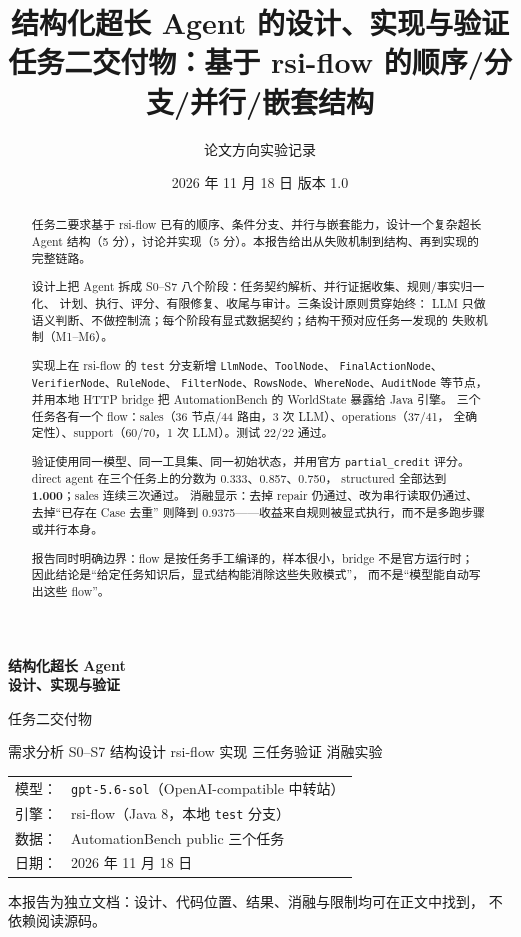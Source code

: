 \documentclass[UTF8,a4paper,11pt]{ctexart}
\title{\textbf{结构化超长 Agent 的设计、实现与验证}\\[6pt]
\large 任务二交付物：基于 rsi-flow 的顺序/分支/并行/嵌套结构}
\author{论文方向实验记录}
\date{2026 年 11 月 18 日 \quad 版本 1.0}
\begin{document}
\begin{titlepage}
\centering
\vspace*{3cm}
{\Huge\bfseries 结构化超长 Agent\\[8pt] 设计、实现与验证\par}
\vspace{0.8cm}
{\Large 任务二交付物\par}
\vspace{1.5cm}
{\large 需求分析 \quad S0--S7 结构设计 \quad rsi-flow 实现 \quad 三任务验证 \quad 消融实验\par}
\vspace{3cm}
\begin{tabular}{rl}
模型： & \texttt{gpt-5.6-sol}（OpenAI-compatible 中转站） \\
引擎： & rsi-flow（Java 8，本地 \texttt{test} 分支） \\
数据： & AutomationBench public 三个任务 \\
日期： & 2026 年 11 月 18 日 \\
\end{tabular}
\vfill
{\small 本报告为独立文档：设计、代码位置、结果、消融与限制均可在正文中找到，
不依赖阅读源码。\par}
\end{titlepage}

\begin{abstract}
任务二要求基于 rsi-flow 已有的顺序、条件分支、并行与嵌套能力，设计一个复杂超长
Agent 结构（5 分），讨论并实现（5 分）。本报告给出从失败机制到结构、再到实现的
完整链路。

设计上把 Agent 拆成 S0--S7 八个阶段：任务契约解析、并行证据收集、规则/事实归一化、
计划、执行、评分、有限修复、收尾与审计。三条设计原则贯穿始终：
LLM 只做语义判断、不做控制流；每个阶段有显式数据契约；结构干预对应任务一发现的
失败机制（M1--M6）。

实现上在 rsi-flow 的 \texttt{test} 分支新增 \texttt{LlmNode}、\texttt{ToolNode}、
\texttt{FinalActionNode}、\texttt{VerifierNode}、\texttt{RuleNode}、
\texttt{FilterNode}、\texttt{RowsNode}、\texttt{WhereNode}、\texttt{AuditNode}
等节点，并用本地 HTTP bridge 把 AutomationBench 的 WorldState 暴露给 Java 引擎。
三个任务各有一个 flow：sales（36 节点/44 路由，3 次 LLM）、operations（37/41，
全确定性）、support（60/70，1 次 LLM）。测试 22/22 通过。

验证使用同一模型、同一工具集、同一初始状态，并用官方 \texttt{partial\_credit}
评分。direct agent 在三个任务上的分数为 0.333、0.857、0.750，
structured 全部达到 \textbf{1.000}；sales 连续三次通过。
消融显示：去掉 repair 仍通过、改为串行读取仍通过、去掉“已存在 Case 去重”
则降到 0.9375——收益来自规则被显式执行，而不是多跑步骤或并行本身。

报告同时明确边界：flow 是按任务手工编译的，样本很小，bridge 不是官方运行时；
因此结论是“给定任务知识后，显式结构能消除这些失败模式”，
而不是“模型能自动写出这些 flow”。
\end{abstract}
\end{document}
